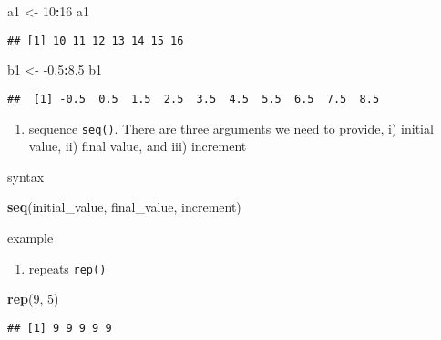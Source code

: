 \documentclass[]{book}
\newenvironment{Shaded}{\begin{snugshade}}{\end{snugshade}}
\newcommand{\DecValTok}[1]{\textcolor[rgb]{0.00,0.00,0.81}{#1}}
\newcommand{\FloatTok}[1]{\textcolor[rgb]{0.00,0.00,0.81}{#1}}
\newcommand{\KeywordTok}[1]{\textcolor[rgb]{0.13,0.29,0.53}{\textbf{#1}}}
\newcommand{\NormalTok}[1]{#1}
\newcommand{\OperatorTok}[1]{\textcolor[rgb]{0.81,0.36,0.00}{\textbf{#1}}}
\newcommand{\StringTok}[1]{\textcolor[rgb]{0.31,0.60,0.02}{#1}}
\providecommand{\tightlist}{%
  \setlength{\itemsep}{0pt}\setlength{\parskip}{0pt}}
\begin{document}
\begin{Shaded}
\begin{Highlighting}[]
\NormalTok{a1 <-}\StringTok{ }\DecValTok{10}\OperatorTok{:}\DecValTok{16}
\NormalTok{a1}
\end{Highlighting}
\end{Shaded}

\begin{verbatim}
## [1] 10 11 12 13 14 15 16
\end{verbatim}

\begin{Shaded}
\begin{Highlighting}[]
\NormalTok{b1 <-}\StringTok{ }\FloatTok{-0.5}\OperatorTok{:}\FloatTok{8.5}
\NormalTok{b1}
\end{Highlighting}
\end{Shaded}

\begin{verbatim}
##  [1] -0.5  0.5  1.5  2.5  3.5  4.5  5.5  6.5  7.5  8.5
\end{verbatim}

\begin{enumerate}
\def\labelenumi{\arabic{enumi}.}
\setcounter{enumi}{1}
\tightlist
\item
  sequence \texttt{seq()}. There are three arguments we need to provide, i) initial value, ii) final value, and iii) increment
\end{enumerate}

syntax

\begin{Shaded}
\begin{Highlighting}[]
\KeywordTok{seq}\NormalTok{(initial_value, final_value, increment)}
\end{Highlighting}
\end{Shaded}

example

\begin{enumerate}
\def\labelenumi{\arabic{enumi}.}
\setcounter{enumi}{2}
\tightlist
\item
  repeats \texttt{rep()}
\end{enumerate}

\begin{Shaded}
\begin{Highlighting}[]
\KeywordTok{rep}\NormalTok{(}\DecValTok{9}\NormalTok{, }\DecValTok{5}\NormalTok{)}
\end{Highlighting}
\end{Shaded}

\begin{verbatim}
## [1] 9 9 9 9 9
\end{verbatim}
\end{document}
